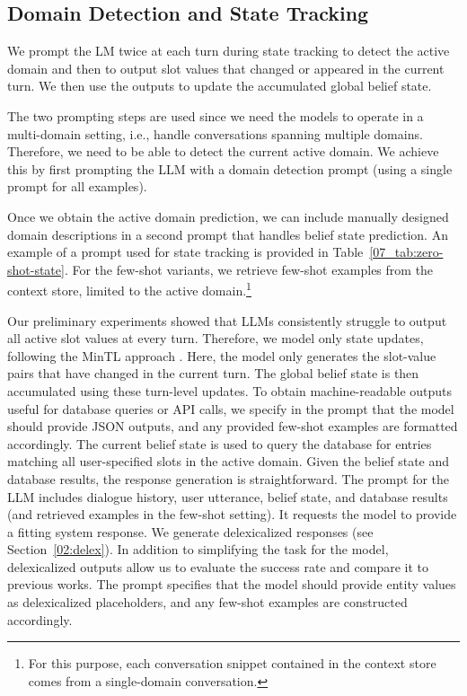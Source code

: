 \subsection{Domain Detection and State Tracking}
\label{07:sec:state-tracking}

We prompt the LM twice at each turn during state tracking to detect the active domain and then to output slot values that changed or appeared in the current turn. We then use the outputs to update the accumulated global belief state.

The two prompting steps are used since 
we need the models to operate in a multi-domain setting, i.e., handle conversations spanning multiple domains.
Therefore, we need to be able to detect the current active domain.
We achieve this by first prompting the LLM with a domain detection prompt (using a single prompt for all examples).

Once we obtain the active domain prediction, we can include manually designed domain descriptions in a second prompt that handles belief state prediction.
An example of a prompt used for state tracking is provided in Table~\ref{07_tab:zero-shot-state}.
For the few-shot variants, %
we retrieve few-shot examples from the context store, limited to the active domain.\footnote{For this purpose, each conversation snippet contained in the context store comes from a single-domain conversation.}

Our preliminary experiments showed that LLMs consistently struggle to output all active slot values at every turn.
Therefore, we model only state updates, following the MinTL approach \cite{lin-etal-2020-mintl}.
Here, the model only generates the slot-value pairs that have changed in the current turn.
The global belief state is then accumulated using these turn-level updates.
To obtain machine-readable outputs useful for database queries or API calls,
we specify in the prompt that the model should provide JSON outputs, and any provided few-shot examples are formatted accordingly. 
The current belief state is used to query the database for entries matching all user-specified slots in the active domain. Given the belief state and database results, the response generation is straightforward.
The prompt for the LLM includes dialogue history, user utterance, belief state, and database results (and retrieved examples in the few-shot setting).
It requests the model to provide a fitting system response.
We generate delexicalized responses (see Section~\ref{02:delex}).
In addition to simplifying the task for the model, delexicalized outputs allow us to evaluate the success rate and compare it to previous works.
The prompt specifies that the model should provide entity values as delexicalized placeholders, and any few-shot examples are constructed accordingly.

